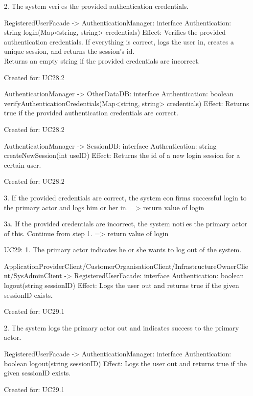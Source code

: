             2. The system veries the provided authentication credentials.

                RegisteredUserFacade -> AuthenticationManager: interface Authentication: string login(Map<string, string> credentials)
                    Effect: Verifies the provided authentication credentials. If everything is correct, logs the user in, creates a unique session, and returns the session's id. \\
                            Returns an empty string if the provided credentials are incorrect.
                    \item Created for: UC28.2

                AuthenticationManager -> OtherDataDB: interface Authentication: boolean verifyAuthenticationCredentials(Map<string, string> credentials)
                    Effect: Returns true if the provided authentication credentials are correct.
                    \item Created for: UC28.2

                AuthenticationManager -> SessionDB: interface Authentication: string createNewSession(int useID)
                    Effect: Returns the id of a new login session for a certain user.
                    \item Created for: UC28.2

            3. If the provided credentials are correct, the system confirms successful login to the primary actor and logs him or her in.
                => return value of login

            3a. If the provided credentials are incorrect, the system noties the primary actor of this. Continue from step 1.
                => return value of login

        UC29:
            1. The primary actor indicates he or she wants to log out of the system.

                ApplicationProviderClient/CustomerOrganisationClient/InfrastructureOwnerClient/SysAdminClient -> RegisteredUserFacade: interface Authentication: boolean logout(string sessionID)
                    Effect: Logs the user out and returns true if the given sessionID exists.
                    \item Created for: UC29.1

            2. The system logs the primary actor out and indicates success to the primary actor.

                RegisteredUserFacade -> AuthenticationManager: interface Authentication: boolean logout(string sessionID)
                    Effect: Logs the user out and returns true if the given sessionID exists.
                    \item Created for: UC29.1


